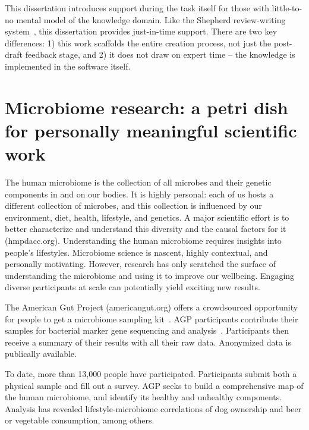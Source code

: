 This dissertation introduces support during the task itself for those with little-to-no mental model of the knowledge domain. 
Like the Shepherd review-writing system~\cite{dow2012shepherding}, this dissertation provides just-in-time support. 
There are two key differences: 1) this work scaffolds the entire creation process, not just the post-draft feedback
 stage, and 2) it does not draw on expert time – the knowledge is implemented in the software itself. 


\section{Microbiome research: a petri dish for personally meaningful scientific work}
The human microbiome is the collection of all microbes and
their genetic components in and on our bodies. It is highly
personal: each of us hosts a different collection of microbes,
and this collection is influenced by our environment, diet,
health, lifestyle, and genetics. A major scientific effort is to
better characterize and understand this diversity and the
causal factors for it (hmpdacc.org). Understanding the human microbiome requires insights
into people’s lifestyles. Microbiome science is nascent, highly contextual, and personally motivating.
However, research has only scratched the surface of understanding the microbiome and using it 
to improve our wellbeing. Engaging diverse participants at scale can potentially yield exciting new results.


The American Gut Project (americangut.org) offers a
crowdsourced opportunity for people to get a microbiome
sampling kit~\cite{KnightLab2016a}. AGP
participants contribute their samples for bacterial marker
gene sequencing and analysis~\cite{Debelius2016}. Participants then receive
a summary of their results with all their raw data. Anonymized data is publically available.

To date, more than 13,000 people have participated.
Participants submit both a physical sample and fill out
a survey. AGP seeks to build a comprehensive map of the human microbiome, and identify
its healthy and unhealthy components. Analysis has revealed lifestyle-microbiome correlations
of dog ownership and beer or vegetable consumption,
among others.


